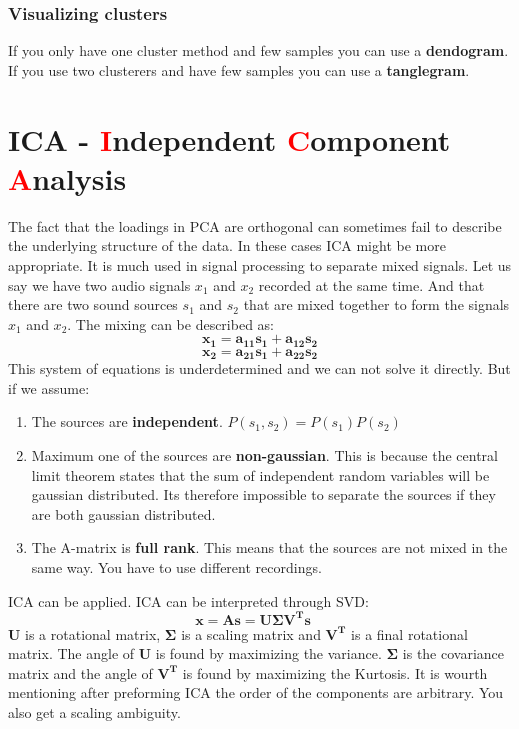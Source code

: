 \subsubsection{Visualizing clusters}
If you only have one cluster method and few samples you can use a \textbf{dendogram}. If you use two clusterers and have few samples you can use a \textbf{tanglegram}.


\section{ICA - \textcolor{red}{I}ndependent \textcolor{red}{C}omponent \textcolor{red}{A}nalysis}
The fact that the loadings in PCA are orthogonal can sometimes fail to describe the underlying structure of the data. In these cases ICA might be more appropriate. It is much used in signal processing to separate mixed signals. Let us say we have two audio signals $x_1$ and $x_2$ recorded at the same time. And that there are two sound sources $s_1$ and $s_2$ that are mixed together to form the signals $x_1$ and $x_2$. The mixing can be described as:
\begin{equation}
    \mathbf{
    x_1 = a_{11}s_1 + a_{12}s_2 
    }
\end{equation}
\begin{equation}
    \mathbf{
    x_2 = a_{21}s_1 + a_{22}s_2
    }
\end{equation}
This system of equations is underdetermined and we can not solve it directly. But if we assume:
\begin{enumerate}
    \item The sources are \textbf{independent}. $P(s_1,s_2) = P(s_1)P(s_2)$
    \item Maximum one of the sources are \textbf{non-gaussian}. This is because the central limit theorem states that the sum of independent random variables will be gaussian distributed. Its therefore impossible to separate the sources if they are both gaussian distributed.
    \item The A-matrix is \textbf{full rank}. This means that the sources are not mixed in the same way. You have to use different recordings.
\end{enumerate}
ICA can be applied. ICA can be interpreted through SVD:
\begin{equation}
    \mathbf{
    x = As  =  U\Sigma V^Ts \quad
    }
\end{equation}
$\mathbf{U}$ is a rotational matrix, $\mathbf{\Sigma}$ is a scaling matrix and $\mathbf{V^T}$ is a final rotational matrix. The angle of $\mathbf{U}$ is found by maximizing the variance. $\mathbf{\Sigma}$ is the covariance matrix and the angle of $\mathbf{V^T}$ is found by maximizing the Kurtosis. \newline \newline
It is wourth mentioning after preforming ICA the order of the components are arbitrary. You also get a scaling ambiguity. \newline


